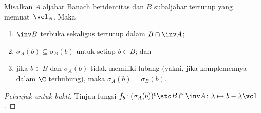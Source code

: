 \begin{prop} Misalkan $A$ aljabar Banach beridentitas dan $B$ subaljabar tertutup yang memuat~$\vc 1_A$.
Maka
 \begin{enumerate}[label=\rm{(\alph*)}]
   \item $\inv B$ terbuka sekaligus tertutup dalam $B \cap \inv A$;
   \item $\sigma_A(b) \subseteq \sigma_B(b)$ untuk setiap $b \in B$; dan
   \item jika $b \in B$ dan $\sigma_A(b)$ tidak memiliki lubang (yakni, jika komplemennya dalam $\C$
terhubung), maka $\sigma_A(b) =    \sigma_B(b)$.
 \end{enumerate}
\end{prop}

\begin{proof}[\emph{Petunjuk untuk bukti}] Tinjau fungsi
$f_b\colon (\sigma_A(b))^c \sto B \cap \inv A\colon \lambda \mapsto b - \lambda \vc 1$.   \ns
\end{proof}
